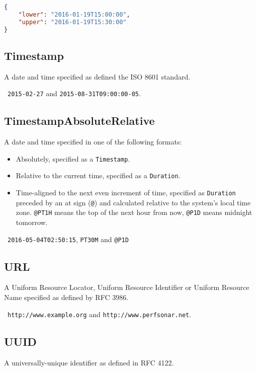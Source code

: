\documentclass[10pt]{article}
\begin{document}
\example
\begin{lstlisting}[language=json]
{
    "lower": "2016-01-19T15:00:00",
    "upper": "2016-01-19T15:30:00"
}
\end{lstlisting}


\subsection{Timestamp}
A date and time specified as defined the ISO 8601 standard.

\example\ {\tt 2015-02-27} and {\tt 2015-08-31T09:00:00-05}.



\subsection{TimestampAbsoluteRelative}
A date and time specified in one of the following formats:
\begin{itemize}
\item Absolutely, specified as a {\tt Timestamp}.
\item Relative to the current time, specified as a {\tt Duration}.
\item Time-aligned to the next even increment of time, specified as
  {\tt Duration} preceded by an at sign ({\tt @}) and calculated
  relative to the system's local time zone.  {\tt @PT1H} means the top
  of the next hour from now, {\tt @P1D} means midnight tomorrow.
\end{itemize}

\example\ {\tt 2016-05-04T02:50:15}, {\tt PT30M} and {\tt @P1D}



\subsection{URL}
A Uniform Resource Locator, Uniform Resource Identifier or Uniform
Resource Name specified as defined by RFC 3986.

\example\ {\tt http://www.example.org} and {\tt http://www.perfsonar.net}.



\subsection{UUID}
A universally-unique identifier as defined in RFC 4122.

\end{document}
